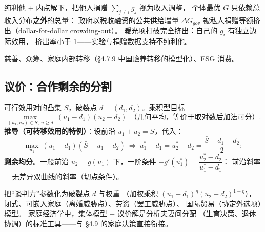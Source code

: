 纯利他 + 内点解下，把他人捐赠 $\sum_{j\ne i}g_j$ 视为收入调整，
个体最优 $G$ 只依赖总收入分布\textbf{之外}的总量：
政府以税收融资的公共供给增量 $\Delta G_{gov}$
被私人捐赠等额挤出（dollar-for-dollar crowding-out）。
暖光项打破完全挤出：自己的 $g_i$ 有独立边际效用，
挤出率小于 1——实验与捐赠数据支持不纯利他。

慈善、众筹、家庭内部转移（§4.7.9 中国赡养转移的模型化）、ESG 消费。

\subsection{议价：合作剩余的分割}

可行效用对的凸集 $S$，破裂点 $d=(d_1,d_2)$。乘积型目标
\[
\max_{(u_1,u_2)\in S,\ u\ge d}\ (u_1-d_1)(u_2-d_2)\ \ \text{（几何平均，等价于取对数后加法可分）}.
\]
\textbf{推导（可转移效用的特例）}：设前沿 $u_1+u_2=\bar S$，代入：
\[
\max_{u_1}\ (u_1-d_1)(\bar S-u_1-d_2)
\ \Longrightarrow\
u_1^{*}-d_1=u_2^{*}-d_2=\frac{\bar S-d_1-d_2}{2}:
\]
\textbf{剩余均分}。一般前沿 $u_2=g(u_1)$ 下，一阶条件
$-g'(u_1^{*})=\dfrac{u_2^{*}-d_2}{u_1^{*}-d_1}$：
前沿斜率 = 无差异双曲线的斜率（切点条件）。

把“谈判力”参数化为破裂点 $d$ 与权重
（加权乘积 $(u_1-d_1)^{\eta}(u_2-d_2)^{1-\eta}$），
闭式、可嵌入家庭（离婚威胁点）、劳资（罢工威胁点）、
国际贸易（协定外选项）模型。
家庭经济学中，集体模型 + 议价解是分析夫妻间分配
（生育决策、退休协调）的标准工具——与 §4.9 的家庭决策直接衔接。
